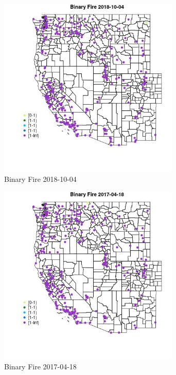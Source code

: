 \begin{figure} 
\centering  
\includegraphics[width=0.77\textwidth]{Code_Outputs/Report_ML_input_PM25_Step4_part_f_de_duplicated_aveswNAs_MapObsBinary_Fire2018-10-04.jpg} 
\caption{\label{fig:Report_ML_input_PM25_Step4_part_f_de_duplicated_aveswNAsMapObsBinary_Fire2018-10-04}Binary Fire 2018-10-04} 
\end{figure} 
 

\begin{figure} 
\centering  
\includegraphics[width=0.77\textwidth]{Code_Outputs/Report_ML_input_PM25_Step4_part_f_de_duplicated_aveswNAs_MapObsBinary_Fire2017-04-18.jpg} 
\caption{\label{fig:Report_ML_input_PM25_Step4_part_f_de_duplicated_aveswNAsMapObsBinary_Fire2017-04-18}Binary Fire 2017-04-18} 
\end{figure} 
 

